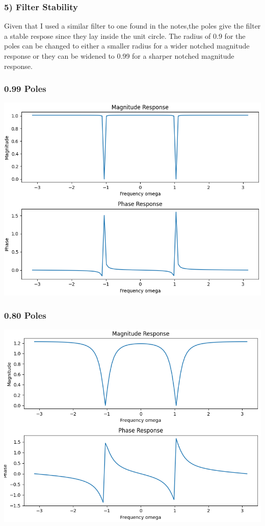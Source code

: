 \documentclass[12pt,letterpaper]{article}
\begin{document}
\subsubsection*{5) Filter Stability}
Given that I used a similar filter to one found in the notes,the poles give the filter a stable respose since they lay inside the unit circle. The radius of 0.9 for the poles can be changed to either a smaller radius for a wider notched magnitude response or they can be widened to 0.99 for a sharper notched magnitude response.\\
\subsubsection*{0.99 Poles}
\includegraphics*[scale=0.3]{p1p5p1.png}
\subsubsection*{0.80 Poles}
\includegraphics*[scale=0.3]{p1p5p2.png}
\newpage
\end{document}
